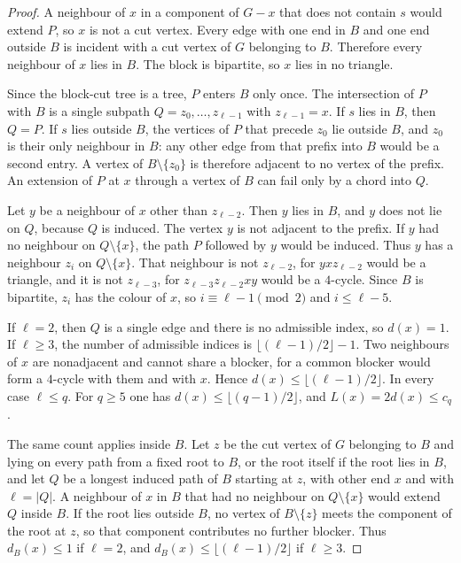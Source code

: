 \documentclass[ASNA]{USG}
\theoremstyle{WBstyletwo}
\numberwithin{equation}{section}
\begin{document}
\begin{proof}
A neighbour of $x$ in a component of $G-x$ that does not contain $s$ would extend $P$, so $x$ is not a cut vertex. Every edge with one end in $B$ and one end outside $B$ is incident with a cut vertex of $G$ belonging to $B$. Therefore every neighbour of $x$ lies in $B$. The block is bipartite, so $x$ lies in no triangle.

Since the block-cut tree is a tree, $P$ enters $B$ only once. The intersection of $P$ with $B$ is a single subpath $Q=z_0,\dots,z_{\ell-1}$ with $z_{\ell-1}=x$. If $s$ lies in $B$, then $Q=P$. If $s$ lies outside $B$, the vertices of $P$ that precede $z_0$ lie outside $B$, and $z_0$ is their only neighbour in $B$: any other edge from that prefix into $B$ would be a second entry. A vertex of $B\setminus\{z_0\}$ is therefore adjacent to no vertex of the prefix. An extension of $P$ at $x$ through a vertex of $B$ can fail only by a chord into $Q$.

Let $y$ be a neighbour of $x$ other than $z_{\ell-2}$. Then $y$ lies in $B$, and $y$ does not lie on $Q$, because $Q$ is induced. The vertex $y$ is not adjacent to the prefix. If $y$ had no neighbour on $Q\setminus\{x\}$, the path $P$ followed by $y$ would be induced. Thus $y$ has a neighbour $z_i$ on $Q\setminus\{x\}$. That neighbour is not $z_{\ell-2}$, for $yxz_{\ell-2}$ would be a triangle, and it is not $z_{\ell-3}$, for $z_{\ell-3}z_{\ell-2}xy$ would be a $4$-cycle. Since $B$ is bipartite, $z_i$ has the colour of $x$, so $i\equiv\ell-1\pmod 2$ and $i\le\ell-5$.

If $\ell=2$, then $Q$ is a single edge and there is no admissible index, so $d(x)=1$. If $\ell\ge 3$, the number of admissible indices is $\lfloor(\ell-1)/2\rfloor-1$. Two neighbours of $x$ are nonadjacent and cannot share a blocker, for a common blocker would form a $4$-cycle with them and with $x$. Hence $d(x)\le\lfloor(\ell-1)/2\rfloor$. In every case $\ell\le q$. For $q\ge 5$ one has $d(x)\le\lfloor(q-1)/2\rfloor$, and $L(x)=2d(x)\le c_q$.

The same count applies inside $B$. Let $z$ be the cut vertex of $G$ belonging to $B$ and lying on every path from a fixed root to $B$, or the root itself if the root lies in $B$, and let $Q$ be a longest induced path of $B$ starting at $z$, with other end $x$ and with $\ell=|Q|$. A neighbour of $x$ in $B$ that had no neighbour on $Q\setminus\{x\}$ would extend $Q$ inside $B$. If the root lies outside $B$, no vertex of $B\setminus\{z\}$ meets the component of the root at $z$, so that component contributes no further blocker. Thus $d_B(x)\le 1$ if $\ell=2$, and $d_B(x)\le\lfloor(\ell-1)/2\rfloor$ if $\ell\ge 3$.
\end{proof}
\end{document}
